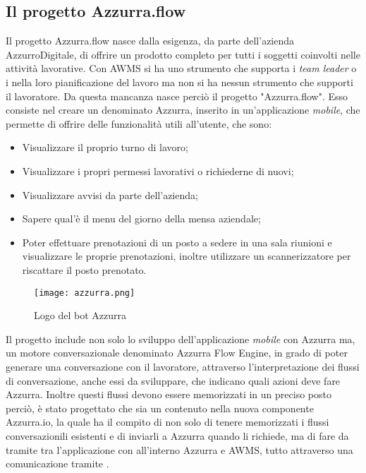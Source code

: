 \subsection{Il progetto Azzurra.flow}

Il progetto Azzurra.flow nasce dalla esigenza, da parte dell'azienda AzzurroDigitale, di offrire un prodotto completo per tutti i soggetti coinvolti nelle attività lavorative. Con \gls{AWMS} si ha uno strumento che supporta i \emph{team leader} o i  nella loro pianificazione del lavoro ma non si ha nessun strumento che supporti il lavoratore. Da questa mancanza nasce perciò il progetto "Azzurra.flow". Esso consiste nel creare un  denominato Azzurra, inserito in un’applicazione \emph{mobile}, che permette di offrire delle funzionalità utili all'utente, che sono:
\begin{itemize}
	\item Visualizzare il proprio turno di lavoro;
	\item Visualizzare i propri permessi lavorativi o richiederne di nuovi;
	\item Visualizzare avvisi da parte dell'azienda;
	\item Sapere qual'è il menu del giorno della mensa aziendale;
	\item Poter effettuare prenotazioni di un posto a sedere in una sala riunioni e visualizzare le proprie prenotazioni, inoltre utilizzare un scannerizzatore  per riscattare il posto prenotato.
\end{itemize}
\begin{figure}[!h] 
	\begin{center}
		\texttt{[image: azzurra.png]}
		\caption{Logo del bot Azzurra}
	\end{center}
\end{figure}
Il progetto include non solo lo sviluppo dell'applicazione \emph{mobile} con Azzurra ma, un motore conversazionale denominato Azzurra Flow Engine, in grado di poter generare una conversazione con il lavoratore, attraverso l'interpretazione dei flussi di conversazione, anche essi da sviluppare, che indicano quali azioni deve fare Azzurra. Inoltre questi flussi devono essere memorizzati in un preciso posto perciò, è stato progettato che sia un  contenuto nella nuova componente Azzurra.io, la quale ha il compito di non solo di tenere memorizzati i flussi conversazionili esistenti e di inviarli a Azzurra quando li richiede, ma di fare da tramite tra l'applicazione con all'interno Azzurra e \gls{AWMS}, tutto attraverso una comunicazione tramite .
